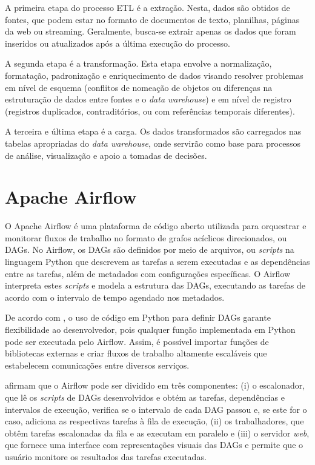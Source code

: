 A primeira etapa do processo ETL é a extração. Nesta, dados são obtidos de fontes, que podem estar no formato de documentos de texto, planilhas, páginas da web ou streaming. Geralmente, busca-se extrair apenas os dados que foram inseridos ou atualizados após a última execução do processo.

A segunda etapa é a transformação. Esta etapa envolve a normalização, formatação, padronização e enriquecimento de dados visando resolver problemas em nível de esquema (conflitos de nomeação de objetos ou diferenças na estruturação de dados entre fontes e o \textit{data warehouse}) e em nível de registro (registros duplicados, contraditórios, ou com referências temporais diferentes).

A terceira e última etapa é a carga. Os dados transformados são carregados nas tabelas apropriadas do \textit{data warehouse}, onde servirão como base para processos de análise, visualização e apoio a tomadas de decisões.

\section{Apache Airflow}

O Apache Airflow é uma plataforma de código aberto utilizada para orquestrar e monitorar fluxos de trabalho no formato de grafos acíclicos direcionados, ou DAGs. No Airflow, os DAGs são definidos por meio de arquivos, ou \textit{scripts} na linguagem Python que descrevem as tarefas a serem executadas e as dependências entre as tarefas, além de metadados com configurações específicas. O Airflow interpreta estes \textit{scripts} e modela a estrutura das DAGs, executando as tarefas de acordo com o intervalo de tempo agendado nos metadados.

De acordo com \cite{de2021data}, o uso de código em Python para definir DAGs garante flexibilidade ao desenvolvedor, pois qualquer função implementada em Python pode ser executada pelo Airflow. Assim, é possível importar funções de bibliotecas externas e criar fluxos de trabalho altamente escaláveis que estabelecem comunicações entre diversos serviços.

\cite{de2021data} afirmam que o Airflow pode ser dividido em três componentes: (i) o escalonador, que lê os \textit{scripts} de DAGs desenvolvidos e obtém as tarefas, dependências e intervalos de execução, verifica se o intervalo de cada DAG passou e, se este for o caso, adiciona as respectivas tarefas à fila de execução, (ii) os trabalhadores, que obtêm tarefas escalonadas da fila e as executam em paralelo e (iii) o servidor \textit{web}, que fornece uma interface com representações visuais das DAGs e permite que o usuário monitore os resultados das tarefas executadas.

